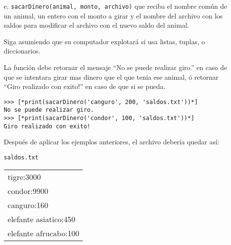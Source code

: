 \begin{itemize}
    \item[e.] \texttt{sacarDinero(animal, monto, archivo)} que reciba el nombre común de un animal, un entero con el monto a girar y el nombre del archivo con los saldos para modificar el archivo con el nuevo saldo del animal. 
    
    Siga asumiendo que su computador explotará si usa listas, tuplas, o diccionarios.
    
    La función debe retornar el mensaje ``No se puede realizar giro.'' en caso de que se intentara girar mas dinero que el que tenia ese animal, ó retornar ``Giro realizado con exito!'' en caso de que si se pueda.

\begin{lstlisting}[style=consola]
>>> [*print(sacarDinero('canguro', 200, 'saldos.txt'))*]
No se puede realizar giro.
>>> [*print(sacarDinero('condor', 100, 'saldos.txt'))*]
Giro realizado con exito!
\end{lstlisting}

Después de aplicar los ejemplos anteriores, el archivo debería quedar así:
\begin{center}
\texttt{saldos.txt}\\
	\begin{tabular}{|l|}
		\hline
tigre:3000\\
condor:9900\\
canguro:160\\
elefante asiatico:450\\
elefante afrucabo:100\\
		\hline
	\end{tabular}
\end{center}

\end{itemize}
